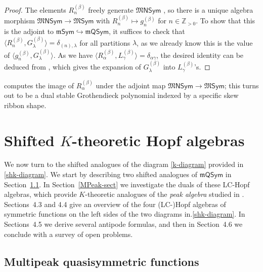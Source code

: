 \documentclass[11pt]{article}
\theoremstyle{definition}
\numberwithin{equation}{section}
\numberwithin{equation}{section}
\newcommand{\ZZ}{\mathbb{Z}}
\newcommand{\MSym}{\mathfrak{M}\mathsf{Sym}}
\newcommand{\MNSym}{\mathfrak{M}\mathsf{NSym}}
\newcommand{\tR}{R^{(\beta)}}
\newcommand{\mSym}{\mathfrak{m}\mathsf{Sym}}
\newcommand{\mQSym}{\mathfrak{m}\mathsf{QSym}}
\newcommand{\PP}{\ZZ_{>0}}
\newcommand{\defn}[1]{{\color{darkred}\emph{#1}}}
\begin{document}
\begin{proof}
The elements $\tR_{n}$
 freely generate $\MNSym$ \cite[Prop.~8.3]{LamPyl},
 so there is a unique algebra morphism $\MNSym \to \MSym$
 with $\tR_n \mapsto g^{(\beta)}_{n} $ for $n \in \PP$. 
To show that this is the adjoint to $\mSym \hookrightarrow \mQSym$,
it suffices to check that $\langle \tR_{n}, G^{(\beta)}_\lambda \rangle= \delta_{(n),\lambda}$ for all partitions $\lambda$,
as we already know this is the value of $\langle g^{(\beta)}_{n}, G^{(\beta)}_\lambda \rangle $.
As we have $ \langle \tR_{\alpha}, L^{(\beta)}_{\gamma} \rangle = \delta_{\alpha\gamma}$, the desired identity can be deduced from \cite[Eq.\ (3.10)]{LM2019},
which gives the expansion of $G^{(\beta)}_\lambda$ into $L^{(\beta)}_\gamma$'s.
\end{proof}


 \cite[Thm.~9.13]{LamPyl} computes the 
 image of $\tR_\alpha$ 
 under the adjoint map $\MNSym \to \MSym$;
 this  turns out to be a dual stable Grothendieck polynomial indexed by a specific skew ribbon shape.


 





 




 




 

\section{Shifted \texorpdfstring{$K$}{K}-theoretic Hopf algebras}\label{main-sect}

We now turn to the shifted analogues of the diagram \eqref{k-diagram} provided in \eqref{shk-diagram}.
%
We start by 
describing two shifted analogues of $\mQSym$
in Section~\ref{multipeak-sect}.
In Section~\ref{MPeak-sect} we investigate the duals of these LC-Hopf algebras, which provide
$K$-theoretic analogues of the \defn{peak algebra} studied in \cite{Nyman,Schocker}.
Sections~4.3 and 4.4 
give an overview of the four (LC-)Hopf algebras of symmetric functions
on the left sides of the two diagrams in.\eqref{shk-diagram}.
In Sections~4.5 
we derive several antipode formulas, and then in
Section~4.6 we conclude with a survey of open problems.



\subsection{Multipeak quasisymmetric functions}\label{multipeak-sect}
\end{document}

